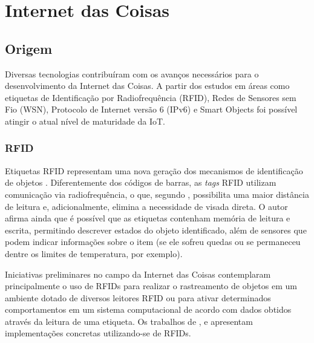 \documentclass[twoside,english,brazilian]{UNISINOSmonografia}
\begin{document}
	\section{Internet das Coisas}
	
\subsection{Origem}

	Diversas tecnologias contribuíram com os avanços necessários para o 
	desenvolvimento da Internet das Coisas. A partir dos estudos em áreas como 
	etiquetas de Identificação por Radiofrequência (RFID), Redes de 
	Sensores sem Fio (WSN), Protocolo de Internet versão 6 (IPv6) e Smart 
	Objects foi possível atingir o atual nível de maturidade da IoT.
	
	
	
\subsubsection{RFID}
	Etiquetas RFID representam uma nova geração dos mecanismos de 
	identificação de objetos \cite{Brock2001}. Diferentemente dos códigos de 
	barras, as \textit{tags} RFID utilizam comunicação via radiofrequência, o 
	que, segundo , possibilita uma maior distância de 
	leitura e, adicionalmente, elimina a necessidade de visada direta. O autor 
	afirma ainda que é possível que as etiquetas contenham memória de leitura 
	e escrita, permitindo descrever estados do objeto identificado, além de 
	sensores que podem indicar informações sobre o item (se ele sofreu quedas 
	ou se permaneceu dentre os limites de temperatura, por exemplo).
	
	Iniciativas preliminares no campo da Internet das Coisas contemplaram 
	principalmente o uso de RFIDs para realizar o rastreamento de objetos em 
	um ambiente dotado de diversos leitores RFID ou para ativar determinados 
	comportamentos em um sistema computacional de acordo com dados obtidos 
	através da leitura de uma etiqueta. Os trabalhos de , 
	 e  apresentam 
	implementações concretas utilizando-se de RFIDs.
\end{document}
